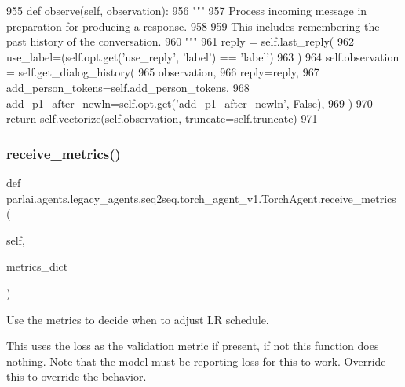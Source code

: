 \begin{DoxyCode}
955     \textcolor{keyword}{def }observe(self, observation):
956         \textcolor{stringliteral}{"""}
957 \textcolor{stringliteral}{        Process incoming message in preparation for producing a response.}
958 \textcolor{stringliteral}{}
959 \textcolor{stringliteral}{        This includes remembering the past history of the conversation.}
960 \textcolor{stringliteral}{        """}
961         reply = self.last\_reply(
962             use\_label=(self.opt.get(\textcolor{stringliteral}{'use\_reply'}, \textcolor{stringliteral}{'label'}) == \textcolor{stringliteral}{'label'})
963         )
964         self.observation = self.get\_dialog\_history(
965             observation,
966             reply=reply,
967             add\_person\_tokens=self.add\_person\_tokens,
968             add\_p1\_after\_newln=self.opt.get(\textcolor{stringliteral}{'add\_p1\_after\_newln'}, \textcolor{keyword}{False}),
969         )
970         \textcolor{keywordflow}{return} self.vectorize(self.observation, truncate=self.truncate)
971 
\end{DoxyCode}
\mbox{\label{classparlai_1_1agents_1_1legacy__agents_1_1seq2seq_1_1torch__agent__v1_1_1TorchAgent_af97699a6b03a17969830db378f09cac4}} 
\subsubsection{\texorpdfstring{receive\+\_\+metrics()}{receive\_metrics()}}
{\footnotesize\ttfamily def parlai.\+agents.\+legacy\+\_\+agents.\+seq2seq.\+torch\+\_\+agent\+\_\+v1.\+Torch\+Agent.\+receive\+\_\+metrics (\begin{DoxyParamCaption}\item[{}]{self,  }\item[{}]{metrics\+\_\+dict }\end{DoxyParamCaption})}

\begin{DoxyVerb}Use the metrics to decide when to adjust LR schedule.

This uses the loss as the validation metric if present, if not this function
does nothing. Note that the model must be reporting loss for this to work.
Override this to override the behavior.
\end{DoxyVerb}
 

